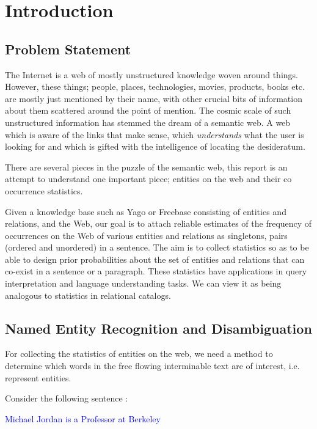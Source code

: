 \section{Introduction}
\subsection{Problem Statement}
The Internet is a web of mostly unstructured knowledge woven around things. However, these things; people, places, technologies, movies, products, books
etc. are mostly just mentioned by their name, with other crucial bits of information about them scattered around the point of mention. The cosmic scale of 
such unstructured information has stemmed the dream of a semantic web. A web which is aware of the links that make sense, which \emph{understands} what the 
user is looking for and which is gifted with the intelligence of locating the desideratum.

There are several pieces in the puzzle of the semantic web, this report is an attempt to understand one important piece; entities on the web and
their co occurrence statistics.


Given a knowledge base such as Yago or Freebase consisting of entities and relations, and the Web, our goal is 
to attach reliable estimates of the frequency of occurrences on the Web of various entities and relations as 
singletons, pairs (ordered and unordered) in a sentence.  
The aim is to collect statistics so as to be able to design prior probabilities about the set of 
entities and relations that can co-exist in a sentence or a paragraph. These statistics have applications in 
query interpretation and language understanding tasks.  
We can view it as being analogous to statistics in relational catalogs.

\subsection{Named Entity Recognition and Disambiguation}
For collecting the statistics of entities on the web, we need a method to determine which words in the 
free flowing interminable text are of interest, i.e. represent entities. 

Consider the following sentence : 

 \begin{center}
\textcolor{blue}{Michael Jordan is a Professor at Berkeley}
   \end{center}

